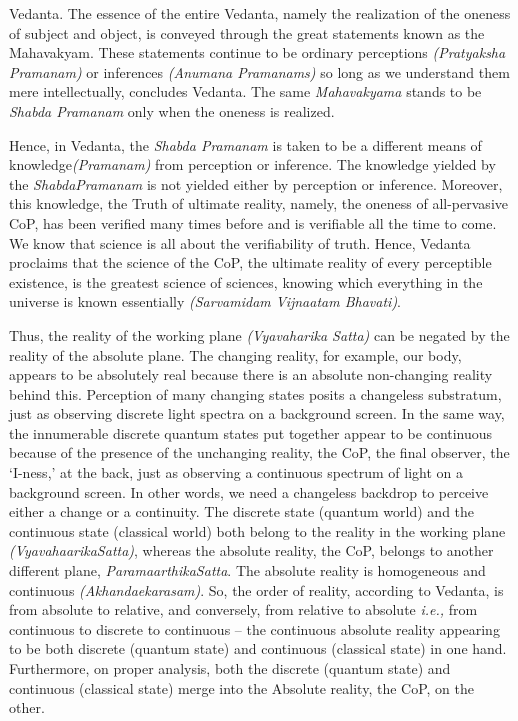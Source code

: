 \documentclass[twoside, 13pt]{article}
\begin{document}
{{Vedanta. The essence of the entire Vedanta, namely the realization of the oneness of subject and object, is conveyed through the great statements known as the Mahavakyam. These statements continue to be ordinary perceptions \textit{(Pratyaksha Pramanam)} or inferences \textit{(Anumana Pramanams)} so long as we understand them mere intellectually, concludes Vedanta. The same \textit{Mahavakyama} stands to be \textit{Shabda Pramanam} only when the oneness is realized. 

Hence, in Vedanta, the \textit{Shabda Pramanam} is taken to be a different means of knowledge\break \textit{(Pramanam)} from perception or inference. The knowledge yielded by the \textit{Shabda\break Pramanam} is not yielded either by perception or inference. Moreover, this knowledge, the Truth of ultimate reality, namely, the oneness of all-pervasive CoP, has been verified many times before and is verifiable all the time to come. We know that science is all about the verifiability of truth. Hence, Vedanta proclaims that the science of the CoP, the ultimate reality of every perceptible existence, is the greatest science of sciences, knowing which everything in the universe is known essentially \textit{(Sarvamidam Vijnaatam Bhavati)}.

Thus, the reality of the working plane \textit{(Vyavaharika Satta)} can be negated by the reality of the absolute plane. The changing reality, for example, our body, appears to be absolutely real because there is an absolute non-changing reality behind this. Perception of many changing states posits a changeless substratum, just as observing discrete light spectra on a background screen. In the same way, the innumerable discrete quantum states put together appear to be continuous because of the presence of the unchanging reality, the CoP, the final observer, the ‘I-ness,’ at the back, just as observing a continuous spectrum of light on a background screen. In other words, we need a changeless backdrop to perceive either a change or a continuity. The discrete state (quantum world) and the continuous state (classical world) both belong to the reality in the working plane \textit{(VyavahaarikaSatta)}, whereas the absolute reality, the CoP, belongs to another different plane, \textit{ParamaarthikaSatta}. The absolute reality is homogeneous and continuous \textit{(Akhandaekarasam)}. So, the order of reality, according to Vedanta, is from absolute to relative, and conversely, from relative to absolute {\it i.e.,} from continuous to discrete to continuous – the continuous absolute reality appearing to be both discrete (quantum state) and continuous (classical state) in one hand. Furthermore, on proper analysis, both the discrete (quantum state) and continuous (classical state) merge into the Absolute reality, the CoP, on the other.

}}
\end{document}
